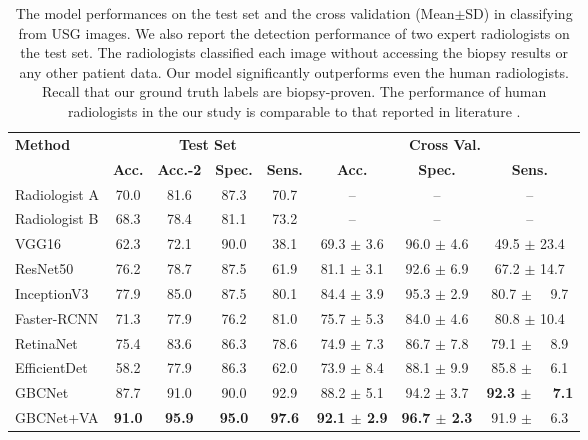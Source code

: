 \begin{table}[t]
	\centering
	\footnotesize
		\begin{tabular}{lccccccc}
			\toprule[1pt]
			\multirow{2}{*}{\textbf{Method}} & \multicolumn{4}{c}{\textbf{Test Set}} & \multicolumn{3}{c}{\textbf{Cross Val.}} \\
			\cmidrule{2-8}
			& \textbf{Acc.} & \textbf{Acc.-2} & \textbf{Spec.} & \textbf{Sens.} & \textbf{Acc.} & \textbf{Spec.} & \textbf{Sens.}  \\
			\midrule[0.5pt]
			Radiologist A & 70.0 & 81.6 & 87.3 & 70.7 & -- & -- & --  \\
			Radiologist B & 68.3 & 78.4 & 81.1 & 73.2 & -- & -- & --  \\
			\midrule
			VGG16 & 62.3 & 72.1 & 90.0 & 38.1 & 69.3 $\pm$ 3.6 & 96.0 $\pm$ 4.6 & 49.5 $\pm$ 23.4 \\ 
			ResNet50 & 76.2 & 78.7 & 87.5 & 61.9 & 81.1 $\pm$ 3.1 &  92.6 $\pm$ 6.9 & 67.2 $\pm$ 14.7 \\ 
			InceptionV3 & 77.9 & 85.0 & 87.5 & 80.1 & 84.4 $\pm$ 3.9 & 95.3 $\pm$ 2.9 & 80.7 $\pm$ ~~9.7 \\
			Faster-RCNN & 71.3 & 77.9 & 76.2 & 81.0 & 75.7 $\pm$ 5.3 & 84.0 $\pm$ 4.6 & 80.8 $\pm$ 10.4 \\
			RetinaNet & 75.4 & 83.6 & 86.3 & 78.6 & 74.9 $\pm$ 7.3 & 86.7 $\pm$ 7.8 & 79.1 $\pm$ ~~8.9 \\
			EfficientDet & 58.2 & 77.9 & 86.3 & 62.0 & 73.9 $\pm$ 8.4 & 88.1 $\pm$ 9.9 & 85.8 $\pm$ ~~6.1 \\
			\midrule%
			GBCNet & 87.7 & 91.0 & 90.0 & 92.9 & 88.2 $\pm$ 5.1 & 94.2 $\pm$ 3.7 & \textbf{92.3 $\pm$ ~~7.1} \\ 
			GBCNet+VA &\textbf{91.0} & \textbf{95.9} & \textbf{95.0} & \textbf{97.6} & \textbf{92.1 $\pm$ 2.9} & \textbf{96.7 $\pm$ 2.3} & 91.9 $\pm$ ~~6.3 \\
			\bottomrule[1pt]
		\end{tabular}
	\caption[Comparing GBCNet with baselines for detecting GBC from USG images]{The model performances on the test set and the cross validation (Mean$\pm$SD) in classifying \gbc from USG images. %
    We also report the \gbc detection performance of two expert radiologists on the test set. The radiologists classified each image without accessing the biopsy results or any other patient data. Our model significantly outperforms even the human radiologists. Recall that our ground truth labels are biopsy-proven. The performance of human radiologists in the our study is comparable to that reported in literature \cite{bo2019diagnostic, gupta2020evaluation}. }
	\label{tbl:perf_gbc}
\end{table}